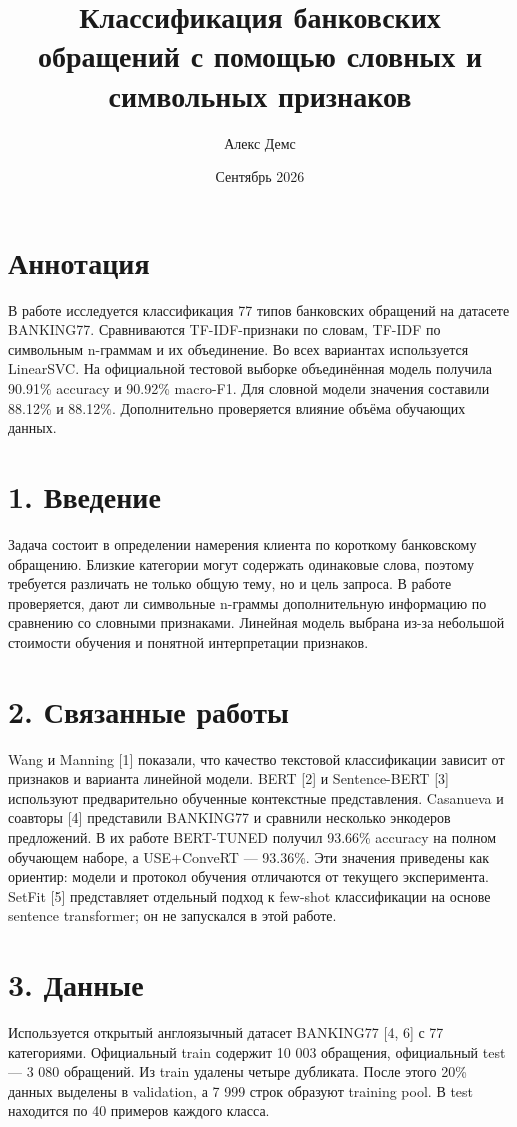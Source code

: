 \documentclass{article}
\title{Классификация банковских обращений с помощью словных и символьных признаков}
\author{Алекс Демс}
\date{Сентябрь 2026}
\begin{document}
\maketitle

\section*{Аннотация}
В работе исследуется классификация 77 типов банковских обращений на датасете BANKING77. Сравниваются TF-IDF-признаки по словам, TF-IDF по символьным n-граммам и их объединение. Во всех вариантах используется LinearSVC. На официальной тестовой выборке объединённая модель получила 90.91\% accuracy и 90.92\% macro-F1. Для словной модели значения составили 88.12\% и 88.12\%. Дополнительно проверяется влияние объёма обучающих данных.

\section*{1. Введение}
Задача состоит в определении намерения клиента по короткому банковскому обращению. Близкие категории могут содержать одинаковые слова, поэтому требуется различать не только общую тему, но и цель запроса. В работе проверяется, дают ли символьные n-граммы дополнительную информацию по сравнению со словными признаками. Линейная модель выбрана из-за небольшой стоимости обучения и понятной интерпретации признаков.

\section*{2. Связанные работы}
Wang и Manning [1] показали, что качество текстовой классификации зависит от признаков и варианта линейной модели. BERT [2] и Sentence-BERT [3] используют предварительно обученные контекстные представления. Casanueva и соавторы [4] представили BANKING77 и сравнили несколько энкодеров предложений. В их работе BERT-TUNED получил 93.66\% accuracy на полном обучающем наборе, а USE+ConveRT --- 93.36\%. Эти значения приведены как ориентир: модели и протокол обучения отличаются от текущего эксперимента. SetFit [5] представляет отдельный подход к few-shot классификации на основе sentence transformer; он не запускался в этой работе.

\section*{3. Данные}
Используется открытый англоязычный датасет BANKING77 [4, 6] с 77 категориями. Официальный train содержит 10 003 обращения, официальный test --- 3 080 обращений. Из train удалены четыре дубликата. После этого 20\% данных выделены в validation, а 7 999 строк образуют training pool. В test находится по 40 примеров каждого класса.
\end{document}
